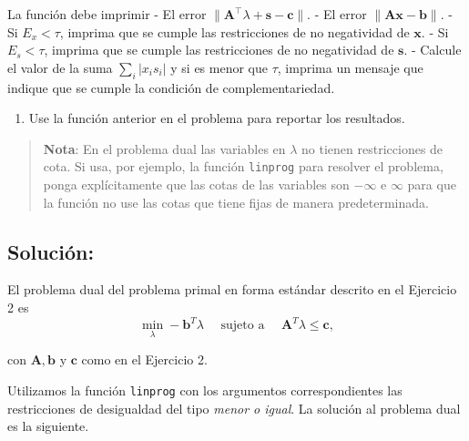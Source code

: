 \documentclass[11pt]{article}
\providecommand{\tightlist}{%
      \setlength{\itemsep}{0pt}\setlength{\parskip}{0pt}}
\begin{document}
La función debe imprimir - El error
\(\|\mathbf{A}^\top \lambda + \mathbf{s}- \mathbf{c}\|\). - El
error \(\|\mathbf{A}\mathbf{x} - \mathbf{b}\|\). - Si \(E_x<\tau\),
imprima que se cumple las restricciones de no negatividad de
\(\mathbf{x}\). - Si \(E_s<\tau\), imprima que se cumple las
restricciones de no negatividad de \(\mathbf{s}\). - Calcule el valor de
la suma \(\sum_i |x_i s_i|\) y si es menor que \(\tau\), imprima un
mensaje que indique que se cumple la condición de complementariedad.

\begin{enumerate}
\def\labelenumi{\arabic{enumi}.}
\setcounter{enumi}{5}
\tightlist
\item
  Use la función anterior en el problema para reportar los resultados.
\end{enumerate}

\begin{quote}
\textbf{Nota}: En el problema dual las variables en \(\lambda\) no
tienen restricciones de cota. Si usa, por ejemplo, la función
\texttt{linprog} para resolver el problema, ponga explícitamente que las
cotas de las variables son \(-\infty\) e \(\infty\) para que la función
no use las cotas que tiene fijas de manera predeterminada.
\end{quote}

\hypertarget{soluciuxf3n}{%
\subsection{Solución:}\label{soluciuxf3n}}

    El problema dual del problema primal en forma estándar descrito en el
Ejercicio 2 es \[
\min_{\lambda}-\mathbf{b}^T\lambda\quad\text{  sujeto a  }\quad \mathbf{A}^T\lambda\leq \mathbf{c},
\]

con \(\mathbf{A},\mathbf{b}\) y \(\mathbf{c}\) como en el Ejercicio 2.

Utilizamos la función \texttt{linprog} con los argumentos
correspondientes las restricciones de desigualdad del tipo \emph{menor o
igual}. La solución al problema dual es la siguiente.
\end{document}

